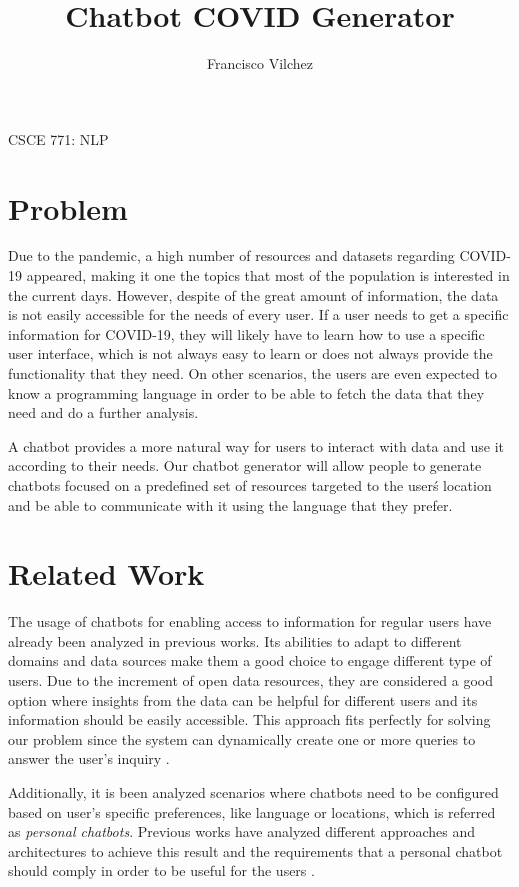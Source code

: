 \documentclass[]{article}
\title{Chatbot COVID Generator}
\author{Francisco Vilchez}
\makeatletter
\renewcommand\maketitle {
  \begin{center}
    {\Large{\course}}
    \medskip\par\noindent
    {\Large\textbf{\@title}}
    \medskip\par\noindent
    {\Large\@author}
    \medskip\par\noindent
    {\Large\@date}
    \bigskip\par\noindent
  \end{center}
}
\newcommand{\course}{CSCE 771: NLP}
\makeatother
\begin{document}
\maketitle

\section{Problem}

Due to the pandemic, a high number of resources and datasets regarding COVID-19 appeared, making it one the topics that most of the population is interested in the current days. However, despite of the great amount of information, the data is not easily accessible for the needs of every user. If a user needs to get a specific information for COVID-19, they will likely have to learn how to use a specific user interface, which is not always easy to learn or does not always provide the functionality that they need. On other scenarios, the users are even expected to know a programming language in order to be able to fetch the data that they need and do a further analysis.

A chatbot provides a more natural way for users to interact with data and use it according to their needs. Our chatbot generator will allow people to generate chatbots focused on a predefined set of resources targeted to the user\'s location and be able to communicate with it using the language that they prefer.

\section{Related Work}
The usage of chatbots for enabling access to information for regular users have already been analyzed in previous works. Its abilities to adapt to different domains and data sources make them a good choice to engage different type of users. Due to the increment of open data resources, they are considered a good option where insights from the data can be helpful for different users and its information should be easily accessible. This approach fits perfectly for solving our problem since the system can dynamically create one or more queries to answer the user's inquiry \cite{srivastava2018decision}.

Additionally, it is been analyzed scenarios where chatbots need to be configured based on user's specific preferences, like language or locations, which is referred as \emph{personal chatbots}. Previous works have analyzed different approaches and architectures to achieve this result and the requirements that a personal chatbot should comply in order to be useful for the users \cite{daniel2018toward}.
\end{document}
